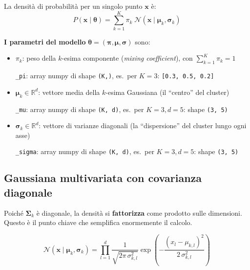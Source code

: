 \documentclass[11pt,a4paper]{article}
\begin{document}
La densit\`a di probabilit\`a per un singolo punto $\mathbf{x}$ \`e:
\begin{equation}
    \boxed{P(\mathbf{x}\mid\boldsymbol{\theta}) = \sum_{k=1}^{K} \pi_k \;\mathcal{N}(\mathbf{x}\mid\boldsymbol{\mu}_k, \boldsymbol{\sigma}_k)}
    \label{eq:gmm}
\end{equation}

\textbf{I parametri del modello} $\boldsymbol{\theta} = (\boldsymbol{\pi}, \boldsymbol{\mu}, \boldsymbol{\sigma})$ sono:
\begin{itemize}
    \item $\pi_k$: peso della $k$-esima componente (\emph{mixing coefficient}), con $\sum_{k=1}^K \pi_k = 1$

    \texttt{\_pi}: array numpy di shape \texttt{(K,)}, es.\ per $K=3$: \texttt{[0.3, 0.5, 0.2]}

    \item $\boldsymbol{\mu}_k \in \mathbb{R}^d$: vettore media della $k$-esima Gaussiana (il ``centro'' del cluster)

    \texttt{\_mu}: array numpy di shape \texttt{(K, d)}, es.\ per $K=3, d=5$: shape \texttt{(3, 5)}

    \item $\boldsymbol{\sigma}_k \in \mathbb{R}^d$: vettore di varianze diagonali (la ``dispersione'' del cluster lungo ogni asse)

    \texttt{\_sigma}: array numpy di shape \texttt{(K, d)}, es.\ per $K=3, d=5$: shape \texttt{(3, 5)}
\end{itemize}

\subsection{Gaussiana multivariata con covarianza diagonale}

Poich\'e $\boldsymbol{\Sigma}_k$ \`e diagonale, la densit\`a si \textbf{fattorizza} come prodotto sulle dimensioni. Questo \`e il punto chiave che semplifica enormemente il calcolo.

\begin{equation}
    \mathcal{N}(\mathbf{x}\mid\boldsymbol{\mu}_k, \boldsymbol{\sigma}_k) = \prod_{l=1}^{d} \frac{1}{\sqrt{2\pi\,\sigma_{k,l}^2}} \exp\!\left(-\frac{(x_l - \mu_{k,l})^2}{2\,\sigma_{k,l}^2}\right)
\end{equation}
\end{document}
